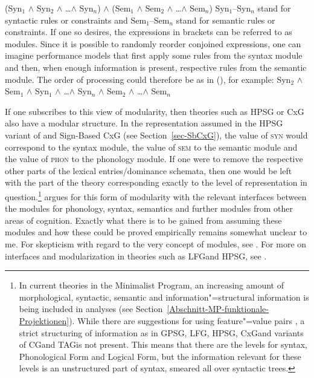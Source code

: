 \ea
(Syn$_1$ $\wedge$ Syn$_2$ $\wedge$ \ldots $\wedge$ Syn$_n$) $\wedge$ (Sem$_1$ $\wedge$ Sem$_2$ $\wedge$ \ldots $\wedge$ Sem$_n$)
\z
Syn$_1$--Syn$_n$ stand for syntactic rules or constraints and Sem$_1$--Sem$_n$ stand for semantic rules or constraints.
If one so desires, the expressions in brackets can be referred to as modules. Since it is possible
to randomly reorder conjoined expressions, one can imagine performance models that first apply some
rules from the syntax module and then, when enough information is present, respective rules from the
semantic module. The order of processing could therefore be as in (), for example: 
\ea
Syn$_2$ $\wedge$ Sem$_1$ $\wedge$ Syn$_1$ $\wedge$ \ldots $\wedge$ Syn$_n$ $\wedge$ Sem$_2$ $\wedge$ \ldots $\wedge$ Sem$_n$
\z

\noindent
If one subscribes to this view of modularity, then theories such as HPSG or CxG also have a modular structure.
In the representation assumed in the HPSG variant of \citet{ps} and Sign-Based CxG (see Section~\ref{sec-SbCxG}),
the value of \textsc{syn} would correspond to the syntax module, the value of \textsc{sem} to the semantic module and the value of \textsc{phon}  to the phonology module. If one were to
remove the respective other parts of the lexical entries/dominance schemata, then one would
 be left with the part of the theory corresponding exactly to the level of representation in question.\footnote{
  In current theories in the Minimalist Program, an increasing amount of morphological, syntactic, semantic and 
  information"=structural information is being included in analyses (see Section~\ref{Abschnitt-MP-funktionale-Projektionen}).
  While there are suggestions for using feature"=value pairs \citep[--291]{SE2002a}, a strict structuring of information
  as in GPSG\indexgpsg, LFG\indexlfg, HPSG\indexhpsg, CxG\indexcxg and variants of
  CG\indexcg and TAG\indextag is not present. This means that there are the levels for syntax, Phonological Form and Logical Form,
  but the information relevant for these levels is an unstructured part of syntax, smeared all over
  syntactic trees.
} 
  argues for this form of modularity with the relevant interfaces between the modules for phonology, syntax, semantics and further modules from other areas of cognition. 
Exactly what there is to be gained from assuming these modules and how these could be proved empirically remains somewhat unclear to me. For skepticism with regard to the very concept of modules, see
. For more on interfaces and modularization in theories such as LFG\indexlfg and HPSG\indexhpsg, see .


